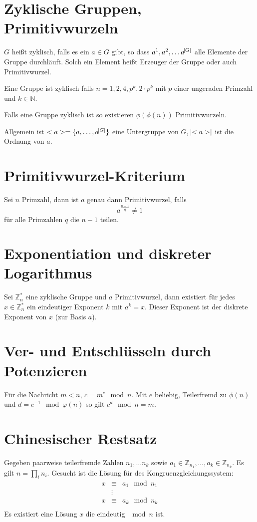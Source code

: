 \section{Zyklische Gruppen, Primitivwurzeln}
$G$ heißt zyklisch, falls es ein $a \in G$ gibt, so dass $a^1, a^2, \ldots a^{\abs{G}}$
alle Elemente der Gruppe durchläuft. Solch ein Element heißt Erzeuger der Gruppe
oder auch Primitivwurzel.

Eine Gruppe ist zyklisch falls $n = 1, 2, 4, p^k, 2\cdot p^k$ mit $p$ einer ungeraden
Primzahl und $k \in \mathbb{N}$.

Falls eine Gruppe zyklisch ist so existieren $\phi(\phi(n))$ Primitivwurzeln.

Allgemein ist $<a> = \{a, \ldots, a^{\abs{G}}\}$ eine Untergruppe von $G$, 
$\abs{<a>}$ ist die Ordnung von $a$.

\section{Primitivwurzel-Kriterium}
Sei $n$ Primzahl, dann ist $a$ genau dann Primitivwurzel, falls
\begin{equation}
    a^{\frac{n-1}{q}} \neq 1
\end{equation}
für alle Primzahlen $q$ die $n-1$ teilen.

\section{Exponentiation und diskreter Logarithmus}
Sei $\mathbb{Z}_n^*$ eine zyklische Gruppe und $a$ Primitivwurzel, dann existiert
für jedes $x \in \mathbb{Z}_n^*$ ein eindeutiger Exponent $k$ mit $a^k = x$.
Dieser Exponent ist der diskrete Exponent von $x$ (zur Basis $a$).

\section{Ver- und Entschlüsseln durch Potenzieren}
Für die Nachricht $m < n$, $c=m^e \mod n$. Mit $e$ beliebig, Teilerfremd zu $\phi(n)$
und $d = e^{-1} \mod \varphi(n)$ so gilt $c^d \mod n = m$.

\section{Chinesischer Restsatz}
Gegeben paarweise teilerfremde Zahlen $n_1, \ldots n_k$ sowie $a_1 \in \mathbb{Z}_{n_1}, \ldots, a_k \in \mathbb{Z}_{n_k}$.
Es gilt $n=\prod_i n_i$.
Gesucht ist die Lösung für des Kongruenzgleichungssystem:
\begin{eqnarray}
    x &\equiv& a_1 \mod n_1 \\
    &\vdots& \\
    x &\equiv& a_k \mod n_k \\
\end{eqnarray}
Es existiert eine Lösung $x$ die eindeutig $\mod n$ ist.

